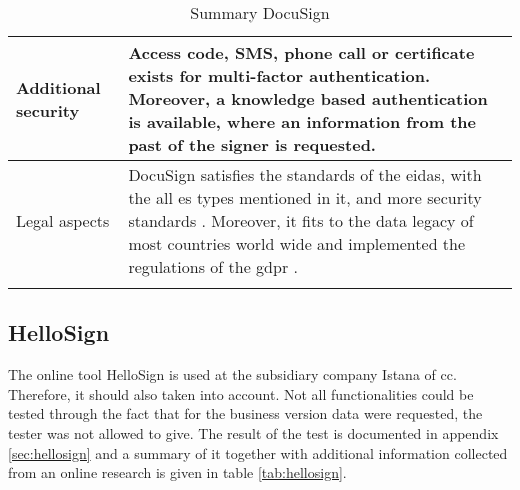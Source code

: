 \begin{longtable}{|p{4cm}|p{10cm}|}
		Additional security & Access code, SMS, phone call or certificate exists for multi-factor authentication. Moreover, a knowledge based authentication is available, where an information from the past of the signer is requested. \parencite{docusign2018security} \\ \hline
		Legal aspects & DocuSign satisfies the standards of the \gls{eidas}, with the all \gls{es} types mentioned in it, and more security standards \parencite{docusign2018certificates,docusign2018legal,docusign2018es}. Moreover, it fits to the data legacy of most countries world wide and implemented the regulations of the \gls{gdpr} \parencite{docusign2018global, docusign2018gdpr}. \\ \hline
	\caption{Summary DocuSign}
	\label{tab:docusign}
	\end{longtable}


\subsection{HelloSign}
The online tool HelloSign is used at the subsidiary company Istana of \gls{cc}. Therefore, it should also taken into account. Not all functionalities could be tested through the fact that for the business version data were requested, the tester was not allowed to give. The result of the test is documented in appendix \ref{sec:hellosign} and a summary of it together with additional information collected from an online research is given in table \ref{tab:hellosign}.
	
